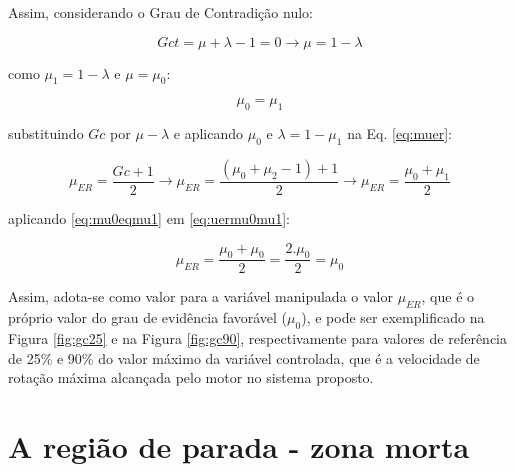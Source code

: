 







\vspace{3cm}

Assim, considerando o Grau de Contradição nulo:

\begin{equation}
Gct = \mu + \lambda - 1 = 0 \rightarrow \mu = 1 - \lambda
\end{equation}

como $\mu_1 = 1 - \lambda$ e $\mu = \mu_0$:

\begin{equation}
\mu_0 = \mu_1
\label{eq:mu0eqmu1}
\end{equation}

substituindo $Gc$ por $\mu-\lambda$ e aplicando $\mu_0$ e $\lambda = 1 - \mu_1$ na Eq. \ref{eq:muer}:

\begin{equation}
\mu_{ER} = \frac{Gc + 1}{2} \rightarrow \mu_{ER} = \frac{(\mu_0 + \mu_2 - 1) + 1}{2} \rightarrow \mu_{ER} = \frac{\mu_0 + \mu_1}{2}
\label{eq:uermu0mu1}
\end{equation}

aplicando \ref{eq:mu0eqmu1} em \ref{eq:uermu0mu1}:

\begin{equation}
\mu_{ER} = \frac{\mu_0 + \mu_0}{2} = \frac{2.\mu_0}{2} = \mu_0
\end{equation}


Assim, adota-se como valor para a variável manipulada 
o valor $\mu_{ER}$, que é o próprio valor do 
grau de evidência favorável ($\mu_0$), 
e pode ser exemplificado na 
Figura \ref{fig:gc25} e na 
Figura \ref{fig:gc90}, 
respectivamente para valores de referência de 25\% e 90\%
do valor máximo da variável controlada, 
que é a velocidade de rotação máxima alcançada 
pelo motor no sistema proposto.










\section{A região de parada - zona morta}

